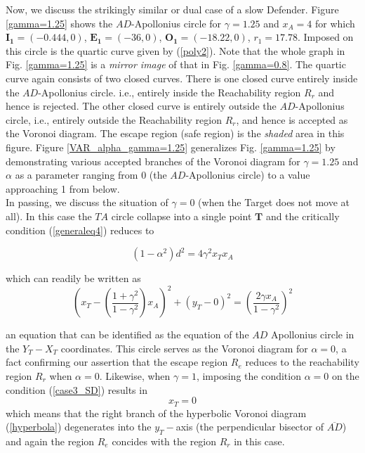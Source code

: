 Now, we discuss the strikingly similar or dual case of a slow Defender. Figure \ref{gamma=1.25} shows the $AD$-Apollonius circle for $\gamma=1.25$ and $x_A=4$ for which $\boldsymbol{I_1}=(-0.444,0)$, $\boldsymbol{E_1}=(-36,0)$, $\boldsymbol{O_1}=(-18.22,0)$, $r_1=17.78$. Imposed on this circle is the quartic curve given by (\ref{poly2}). Note that the whole graph in Fig. \ref{gamma=1.25} is a \textit{mirror image} of that in Fig. \ref{gamma=0.8}. The quartic curve again consists of two closed curves. There is one closed curve entirely inside the $AD$-Apollonius circle. i.e., entirely inside the Reachability region $R_r$ and hence is rejected. The other closed curve is entirely outside the $AD$-Apollonius circle, i.e., entirely outside the Reachability region $R_r$, and hence is accepted as the Voronoi diagram. The escape region (safe region) is the \textit{shaded} area in this figure. Figure \ref{VAR_alpha_gamma=1.25} generalizes Fig. \ref{gamma=1.25} by demonstrating various accepted branches of the Voronoi diagram for $\gamma=1.25$ and $\alpha$ as a parameter ranging from 0 (the $AD$-Apollonius circle) to a value approaching 1 from below.\\ 
    

In passing, we discuss the situation of $\gamma=0$ (when the Target does not move at all). In this case the $TA$ circle collapse into a single point $\boldsymbol{T}$ and the critically condition (\ref{generaleq4}) reduces to 

\begin{equation}
(1-\alpha^{2})d^{2}= 4 \gamma^{2} x_{T} x_{A}
\end{equation}

which can readily be written as 
\begin{equation}
(x_T-(\dfrac{1+\gamma^2}{1-\gamma^2})x_A)^2+(y_T-0)^2
=(\dfrac{2\gamma x_{A}}{1-\gamma^{2}})^{2}
\end{equation}

an equation that can be identified as the equation of the $AD$ Apollonius circle in the $Y_T-X_T$ coordinates.
This circle serves as the Voronoi diagram for $\alpha=0$, a fact confirming our assertion that the escape region $R_e$ reduces to the reachability region $R_r$ when $\alpha=0$. Likewise, when $\gamma=1$, imposing the condition $\alpha=0$ on the condition (\ref{case3_SD}) results in 
\begin{equation}
x_T=0
\end{equation} 
which means that the right branch of the hyperbolic Voronoi diagram (\ref{hyperbola}) degenerates into the $y_T-$axis (the perpendicular bisector of $\overline{AD}$) and again the region $R_e$ concides with the region $R_r$ in this case.


